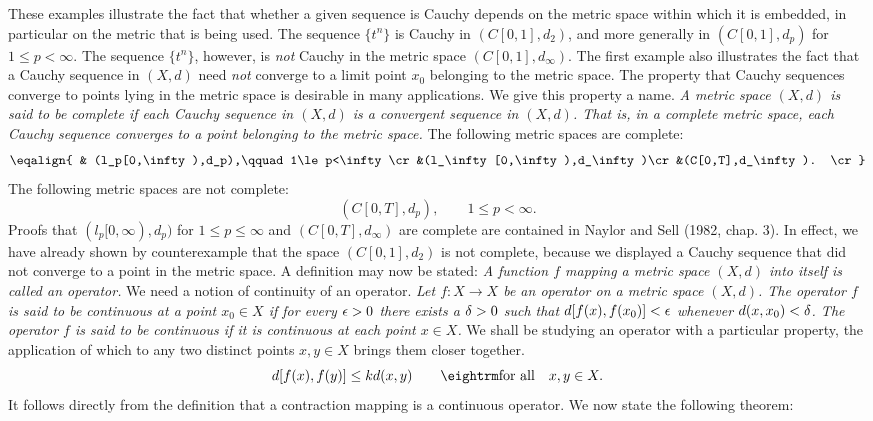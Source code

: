 These examples illustrate the fact that whether a given sequence is Cauchy
depends on the metric space within which it is embedded, in particular on the
metric that is being used.  The sequence $\{t^n\}$ is Cauchy in $(C[0,1],d_2)$,
and more generally in $(C[0,1],d_p)$ for $1\le p<\infty$.  The sequence
$\{t^n\}$, however, is {\it not\/} Cauchy in the metric space
$(C[0,1],d_\infty)$.  The first example also illustrates the fact that a Cauchy
sequence in $(X,d)$ need {\it not\/} converge to a limit point $x_0$ belonging
to the metric space.  The property that Cauchy sequences converge to points
lying in the metric space is desirable in many applications.  We give this
property a name.
\medskip
 {\it A metric space $(X,d)$ is said to be complete
if each Cauchy sequence in $(X,d)$ is a convergent sequence in $(X,d)$.  That
is, in a complete metric space, each Cauchy sequence converges to a point
belonging to the metric space.} \enddefinition
\medskip
The following metric spaces are complete:
$$\eqalign{ & (l_p[0,\infty),d_p),\qquad 1\le p<\infty\cr
&(l_\infty [0,\infty),d_\infty)\cr
&(C[0,T],d_\infty). \cr}$$
The following metric spaces are not complete:
$$(C[0,T],d_p),\qquad 1\le p<\infty.$$
\medskip
Proofs that $(l_p[0,\infty),d_p)$ for $1\le p\le \infty$ and
$(C[0,T],d_\infty)$ are complete are contained in Naylor and Sell (1982,
chap. 3).  In effect, we have already shown by counterexample that the space
$(C[0,1],d_2)$ is not complete, because we displayed a Cauchy sequence that did
not converge to a point in the metric space.  A definition may now be stated:
\medskip
 {\it A function $f$ mapping a metric space $(X,d)$
into itself is called an operator.}\enddefinition
\medskip
We need a notion of continuity of an operator.
\medskip
 {\it Let $f:X\to X$ be an operator on a metric
space $(X,d)$.  The operator $f$ is said to be continuous at a point $x_0\in X$
if for every ${\epsilon}>0$ there exists a ${\delta} >0$ such that $d[f(x),f(x_0)]<{\epsilon}$
whenever $d(x,x_0)<{\delta}$.  The operator $f$ is said to be continuous if it is
continuous at each point $x\in X$.}
\enddefinition
\medskip
We shall be studying an operator with a particular property,
the application of which to
any two distinct points $x,y\in X$ brings them closer together.
\medskip
$$d[f(x),f(y)]\le kd(x,y)\qquad{\rm for\ all}\quad x,y\in X.$$
It follows directly from the definition that a contraction mapping is a
continuous operator.
\medskip
We now state the following theorem:

